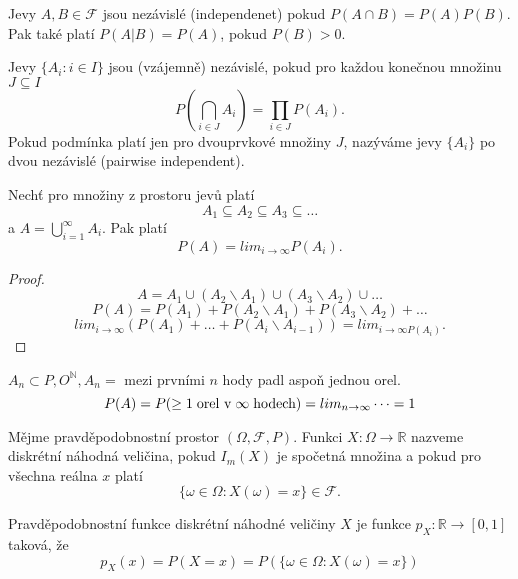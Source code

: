 \documentclass[../main.tex]{subfiles}
\begin{document}
\begin{definition}
    Jevy $A,B \in \mathcal{F}$ jsou nezávislé (independenet) pokud $P(A\cap B) = P(A)P(B)$.\\
    Pak také platí $P(A|B) = P(A)$, pokud $P(B)>0$.
\end{definition}

\begin{definition}
    Jevy $\{A_i : i \in I\}$ jsou (vzájemně) nezávislé, pokud pro každou konečnou množinu $J \subseteq I$
    \[P\left(\bigcap_{i\in J} A_i\right) = \prod_{i\in J} P(A_i).\]
    Pokud podmínka platí jen pro dvouprvkové množiny $J$, nazýváme jevy $\{A_i\}$ po dvou nezávislé (pairwise independent).
\end{definition}

\begin{definition}
    Nechť pro množiny z prostoru jevů platí
    \[A_1 \subseteq A_2 \subseteq A_3 \subseteq \dots\]
    a $A = \bigcup^\infty_{i=1}A_i$. Pak platí
    \[P(A) = lim_{i\rightarrow \infty} P(A_i).\]
    \begin{proof}
        \[A = A_1 \cup (A_2\backslash A_1)\cup (A_3\backslash A_2) \cup \dots\]
        \[P(A) = P(A_1) + P(A_2\backslash A_1) + P(A_3\backslash A_2) + \dots\]
        \[lim_{i\rightarrow \infty} (P(A_1) + \dots + P(A_i \backslash A_{i-1})) = lim_{i\rightarrow \infty P(A_i)}.\]
    \end{proof}
 
    $A_n \subset {P,O}^\mathbb{N}, A_n = $ mezi prvními $n$ hody padl aspoň jednou orel.
    \[P(A) = P(\geq 1 \hspace{1mm} \text{orel v} \hspace{1mm} \infty \hspace{1mm} \text{hodech}) = lim_{n\rightarrow \infty} \dots = 1\]
\end{definition}

\begin{definition}
    Mějme pravděpodobnostní prostor $(\Omega, \mathcal{F}, P).$ Funkci $X : \Omega \rightarrow \mathbb{R}$
    nazveme diskrétní náhodná veličina, pokud $I_m(X)$ je spočetná množina a pokud pro všechna reálna $x$ platí
    \[\{\omega \in \Omega : X(\omega) = x\} \in \mathcal{F}.\]
\end{definition}

\begin{definition}
    Pravděpodobnostní funkce diskrétní náhodné veličiny $X$ je funkce $p_X : \mathbb{R} \rightarrow [0,1]$ taková, že 
    \[p_X(x) = P(X = x) = P(\{\omega \in \Omega : X(\omega) = x\})\]
\end{definition}
\end{document}
